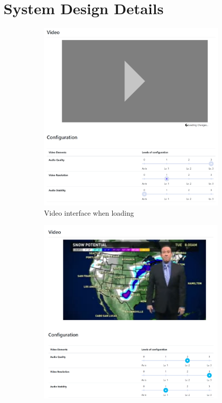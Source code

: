 \section{System Design Details}

\begin{figure}
     \centering
     \begin{subfigure}[ht]{0.49\textwidth}
         \centering
         \includegraphics[width=\textwidth]{content/image/player_loading.png}
         \caption{Video interface when loading}
         \label{fig:video_loading}
     \end{subfigure}
     \hfill
     \begin{subfigure}[ht]{0.49\textwidth}
         \centering
         \includegraphics[width=\textwidth]{content/image/player.png}

\end{subfigure}
\end{figure}
